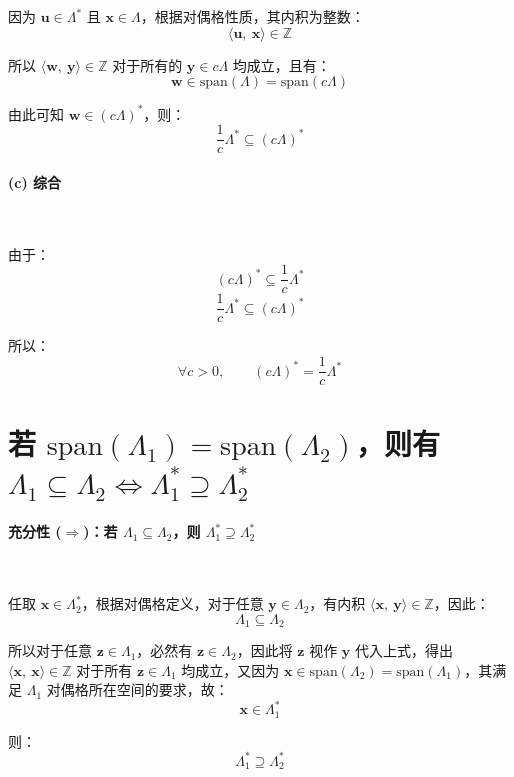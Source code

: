 \documentclass{article}
\begin{document}
因为 $\bm{u}\in\Lambda^{*}$ 且 $\bm{x}\in\Lambda$，根据对偶格性质，其内积为整数：
\[ \langle\bm{u},\ \bm{x}\rangle\in\mathbb{Z} \]

所以 $\langle\bm{w},\ \bm{y}\rangle\in\mathbb{Z}$ 对于所有的 $\bm{y}\in c\Lambda$ 均成立，且有：
\[ \bm{w}\in\mathrm{span}\left(\Lambda\right)=\mathrm{span}\left(c\Lambda\right) \]

由此可知 $\bm{w}\in(c\Lambda)^{*}$，则：
\[ \dfrac{1}{c}\Lambda^{*}\subseteq(c\Lambda)^{*} \]



\paragraph*{(c) 综合}~{\\[-7pt]}

由于：
\[ (c\Lambda)^{*}\subseteq\dfrac{1}{c}\Lambda^{*} \]
\[ \dfrac{1}{c}\Lambda^{*}\subseteq(c\Lambda)^{*} \]

所以：
\[ \forall c>0,\qquad(c\Lambda)^{*}=\dfrac{1}{c}\Lambda^{*} \]



\section{若 $\mathrm{span}(\Lambda_{1})=\mathrm{span}(\Lambda_{2})$，则有 $\Lambda_1\subseteq\Lambda_{2}\iff\Lambda_{1}^{*}\supseteq\Lambda_{2}^{*}$}

\paragraph*{充分性 ($\Rightarrow$)：若 $\Lambda_1\subseteq\Lambda_2$，则 $\Lambda_1^{*}\supseteq\Lambda_2^{*}$}~{\\[-7pt]}

任取 $\bm{x}\in\Lambda_2^{*}$，根据对偶格定义，对于任意 $\bm{y}\in\Lambda_2$，有内积 $\langle\bm{x},\ \bm{y}\rangle\in\mathbb{Z}$，因此：
\[ \Lambda_1\subseteq\Lambda_2 \]

所以对于任意 $\bm{z}\in\Lambda_1$，必然有 $\bm{z}\in\Lambda_2$，因此将 $\bm{z}$ 视作 $\bm{y}$ 代入上式，得出 $\langle\bm{x},\ \bm{x}\rangle\in\mathbb{Z}$ 对于所有 $\bm{z}\in\Lambda_1$ 均成立，又因为 $\bm{x}\in\mathrm{span}\left(\Lambda_2\right)=\mathrm{span}\left(\Lambda_1\right)$，其满足 $\Lambda_1$ 对偶格所在空间的要求，故：
\[ \bm{x}\in\Lambda_1^{*} \]

则：
\[ \Lambda_1^{*}\supseteq\Lambda_2^{*} \]
\end{document}
